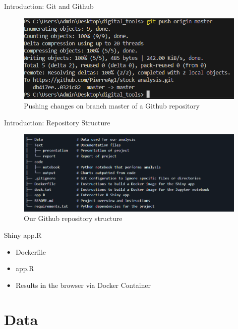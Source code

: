 \documentclass{beamer}
\begin{document}
\begin{frame}{Introduction: Git and Github}
    \begin{figure}
        \centering
        \includegraphics[width=0.9\linewidth]{../images/gitpush.png}
        \caption{Pushing changes on branch master of a Github repository}
        \label{fig:enter-label}
    \end{figure}
\end{frame}


\begin{frame}{Introduction: Repository Structure}
\begin{figure}
    \centering
    \includegraphics[width=0.9\linewidth]{../images/repo_structure.png}
    \caption{Our Github repository structure}
    \label{fig:enter-label}
\end{figure}
    
\end{frame}


\begin{frame}{Shiny app.R}
\begin{itemize}
    \item Dockerfile
    \item app.R
    \item Results in the browser via Docker Container
\end{itemize}
    
\end{frame}


\section{Data}
\end{document}
